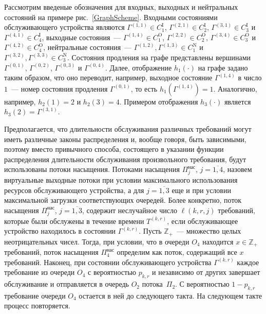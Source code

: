 Рассмотрим введеные обозначения для входных, выходных и нейтральных состояний на примере рис.~\ref{GraphScheme}. Входными состояниями обслуживающего устройства являются $\Gamma^{(1, 1)} \in C_1^{\mathrm{I}}$,  $\Gamma^{(2, 1)} \in C_2^{\mathrm{I}}$,  $\Gamma^{(3, 1)} \in C_3^{\mathrm{I}}$ и $\Gamma^{(4, 1)} \in C_4^{\mathrm{I}}$,  выходные состояния~--- $\Gamma^{(1, 4)} \in C_1^{\mathrm{O}}$,  $\Gamma^{(2, 2)} \in C_2^{\mathrm{O}}$,  $\Gamma^{(3, 4)} \in C_3^{\mathrm{O}}$ и $\Gamma^{(4, 2)} \in C_4^{\mathrm{O}}$,  нейтральные состояния~--- $\Gamma^{(1, 2)},  \Gamma^{(1, 3)} \in C_1^{\mathrm{N}}$ и $\Gamma^{(3, 2)},  \Gamma^{(3, 3)} \in C_3^{\mathrm{N}}$. Состояния продления на графе представлены вершинами $\Gamma^{(0, 1)}$,  $\Gamma^{(0, 2)}$,  $\Gamma^{(0, 3)}$ и $\Gamma^{(0, 4)}$. Далее,  отображение $h_1(\cdot)$ на графе задано таким образом,  что оно переводит,  например,  выходное состояние $\Gamma^{(1, 4)}$ в число $1$~--- номер состояния продления $\Gamma^{(0, 1)}$,  то есть $h_1(\Gamma^{(1, 4)})=1$. Аналогично,  например,  $h_2(1)=2$ и $h_2(3)=4$. Примером отображения $h_3(\cdot)$ является $h_3(2)=\Gamma^{(3, 1)}$.

Предполагается,  что длительности обслуживания различных требований могут  иметь различные законы распределения и, вообще говоря,  быть зависимыми,  поэтому вместо привычного способа,  состоящего в указании функции распределения длительности обслуживания произвольного требования,  будут использованы потоки насыщения. Потоками насыщения $\Pi^{\mathrm{\text{нас}}}_j$,  $j=\overline{1, 4}$,  назовем виртуальные выходные потоки при условии максимального использования ресурсов обслуживающего устройства,  а для $j=\overline{1, 3}$ еще и при условии максимальной загрузки соответствующих очередей.
Более конкретно,  поток насыщения $\Pi^{\mathrm{\text{нас}}}_j$,  $j=\overline{1, 3}$,  содержит неслучайное число $\ell(k, r, j)$ требований,  которые были обслужены в течение времени $T^{(k, r)}$,  если обслуживающее устройство находилось в состоянии $\Gamma^{(k, r)}$. Пусть $\mathbb{Z}_+$~--- множество целых неотрицательных чисел. Тогда,  при условии,  что в очереди $O_4$ находится $x \in \mathbb{Z}_+$ требований,  поток насыщения $\Pi^{\mathrm{\text{нас}}}_4$ определим как поток,  содержащий все $x$ требований.
Наконец,  при состоянии обслуживающего устройства $\Gamma^{(k, r)}$ каждое требование из очереди $O_4$ с вероятностью $p_{k, r}$ и независимо от других завершает обслуживание и отправляется в очередь $O_2$ потока~$\Pi_2$. С вероятностью $1-p_{k, r}$ требование очереди $O_4$ остается в ней до следующего такта. На следующем такте процесс повторяется.

